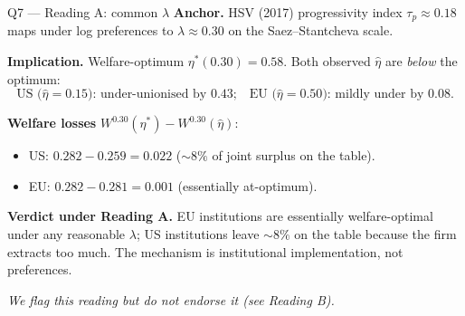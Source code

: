 \documentclass{beamer}
\begin{document}
\begin{frame}{Q7 --- Reading A: common $\lambda$}
\textbf{Anchor.} HSV (2017) progressivity index $\tau_p\!\approx\!0.18$ maps under log preferences to $\lambda\!\approx\!0.30$ on the Saez--Stantcheva scale.

\textbf{Implication.} Welfare-optimum $\eta^{*}(0.30)\!=\!0.58$. Both observed $\hat\eta$ are \emph{below} the optimum:
\[
\text{US ($\hat\eta\!=\!0.15$): under-unionised by 0.43;}\quad \text{EU ($\hat\eta\!=\!0.50$): mildly under by 0.08.}
\]

\textbf{Welfare losses} $W^{0.30}(\eta^{*})-W^{0.30}(\hat\eta)$:
\begin{itemize}\setlength{\itemsep}{4pt}
    \item US: $0.282-0.259=\mathbf{0.022}$ ($\sim\!8\%$ of joint surplus on the table).
    \item EU: $0.282-0.281=\mathbf{0.001}$ (essentially at-optimum).
\end{itemize}

\textbf{Verdict under Reading A.} EU institutions are essentially welfare-optimal under any reasonable $\lambda$; US institutions leave $\sim\!8\%$ on the table because the firm extracts too much. The mechanism is institutional implementation, not preferences.

\vspace{0.3em}
\textit{We flag this reading but do not endorse it (see Reading B).}
\end{frame}
\end{document}
